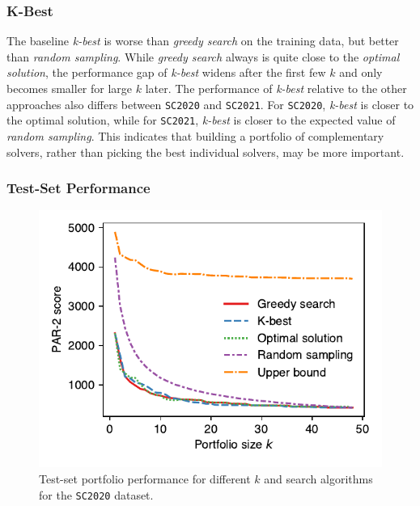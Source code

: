 \documentclass[conference]{IEEEtran}
\begin{document}
\subsubsection{K-Best}

The baseline \emph{k-best} is worse than \emph{greedy search} on the training data, but better than \emph{random sampling}.
While \emph{greedy search} always is quite close to the \emph{optimal solution}, the performance gap of \emph{k-best} widens after the first few $k$ and only becomes smaller for large $k$ later. %
The performance of \emph{k-best} relative to the other approaches also differs between \texttt{SC2020} and \texttt{SC2021}.
For \texttt{SC2020}, \emph{k-best} is closer to the optimal solution, while for \texttt{SC2021}, \emph{k-best} is closer to the expected value of \emph{random sampling}.
This indicates that building a portfolio of complementary solvers, rather than picking the best individual solvers, may be more important. 


\subsubsection{Test-Set Performance} %

\begin{figure}[t]
	\centering
	\includegraphics[width=0.9\columnwidth]{plots/search-test-objective-2020.pdf}
	\caption{Test-set portfolio performance for different $k$ and search algorithms for the \texttt{SC2020} dataset.}
	\label{fig:search-test-objective-2020}
\end{figure}
\end{document}
